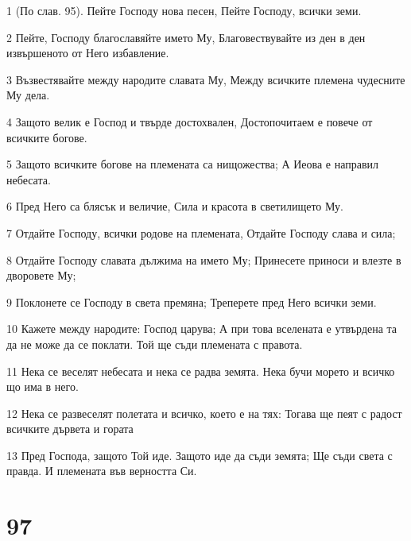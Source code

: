 \par 1 (По слав. 95). Пейте Господу нова песен, Пейте Господу, всички земи.
\par 2 Пейте, Господу благославяйте името Му, Благовествувайте из ден в ден извършеното от Него избавление.
\par 3 Възвестявайте между народите славата Му, Между всичките племена чудесните Му дела.
\par 4 Защото велик е Господ и твърде достохвален, Достопочитаем е повече от всичките богове.
\par 5 Защото всичките богове на племената са нищожества; А Иеова е направил небесата.
\par 6 Пред Него са блясък и величие, Сила и красота в светилището Му.
\par 7 Отдайте Господу, всички родове на племената, Отдайте Господу слава и сила;
\par 8 Отдайте Господу славата дължима на името Му; Принесете приноси и влезте в дворовете Му;
\par 9 Поклонете се Господу в света премяна; Треперете пред Него всички земи.
\par 10 Кажете между народите: Господ царува; А при това вселената е утвърдена та да не може да се поклати. Той ще съди племената с правота.
\par 11 Нека се веселят небесата и нека се радва земята. Нека бучи морето и всичко що има в него.
\par 12 Нека се развеселят полетата и всичко, което е на тях: Тогава ще пеят с радост всичките дървета и гората
\par 13 Пред Господа, защото Той иде. Защото иде да съди земята; Ще съди света с правда. И племената във верността Си.

\chapter{97}

